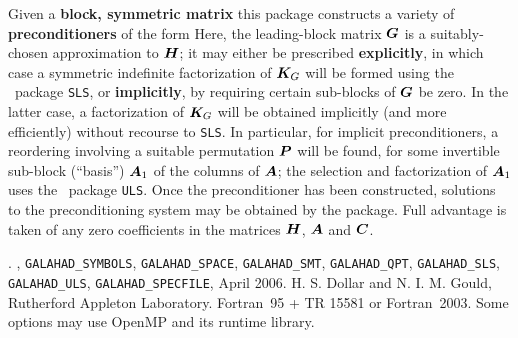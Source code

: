 \documentclass{galahad}
\newcommand{\packagename}{SBLS}
\newcommand{\fullpackagename}{\libraryname\_\packagename}
\begin{document}
\galheader


\galsummary
Given a {\bf block, symmetric matrix}
this package constructs a variety of {\bf preconditioners} of the form
Here, the leading-block matrix ${\bm{G}}$ is a suitably-chosen
approximation to ${\bm{H}}$; it may either be prescribed {\bf explicitly}, in
which case a symmetric indefinite factorization of ${\bm{K}}_{G}$
will be formed using the \galahad\ package {\tt SLS},
or {\bf implicitly}, by requiring certain sub-blocks of ${\bm{G}}$
be zero. In the latter case, a factorization of ${\bm{K}}_{G}$ will be
obtained implicitly (and more efficiently) without recourse to {\tt SLS}.
In particular, for implicit preconditioners, a reordering
involving a suitable permutation ${\bm{P}}$ will be found, for some
invertible sub-block (``basis'') ${\bm{A}}_1$ of the columns of ${\bm{A}}$;
the selection and factorization of ${\bm{A}}_1$ uses
the \galahad\ package {\tt ULS}.
Once the preconditioner has been constructed,
solutions to the preconditioning system
may be obtained by the package.
Full advantage is taken of any zero coefficients in the matrices ${\bm{H}}$,
${\bm{A}}$ and ${\bm{C}}$.


\galattributes
\galversions{\tt  \fullpackagename\_single, \fullpackagename\_double}.
,
{\tt GALAHAD\_\-SY\-M\-BOLS},
{\tt GALAHAD\-\_SPACE},
{\tt GALAHAD\_SMT},
{\tt GALAHAD\_QPT},
{\tt GALAHAD\_SLS},
{\tt GALAHAD\_ULS},
{\tt GALAHAD\_SPECFILE},
\galdate April 2006.
\galorigin H. S. Dollar and N. I. M. Gould,
Rutherford Appleton Laboratory.
\gallanguage Fortran~95 + TR 15581 or Fortran~2003.
\galparallelism Some options may use OpenMP and its runtime library.

\end{document}
